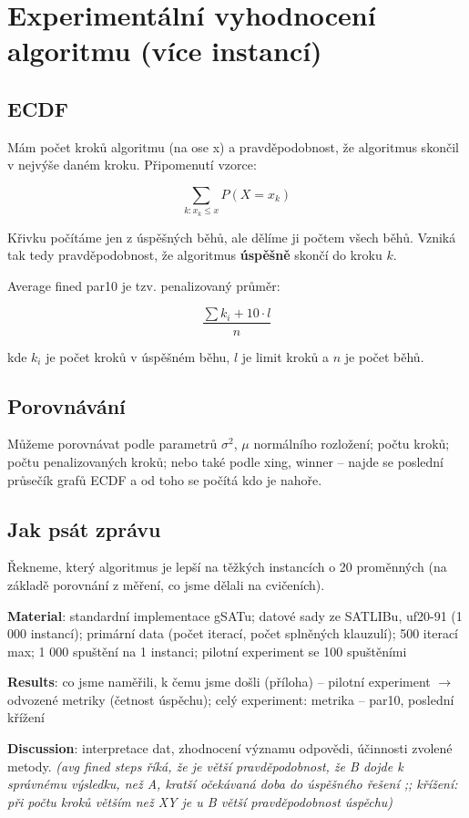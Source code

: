 \section{Experimentální vyhodnocení algoritmu (více instancí)}

\subsection{ECDF}

Mám počet kroků algoritmu (na ose x) a pravděpodobnost, že algoritmus skončil v nejvýše daném kroku. Připomenutí vzorce:

\begin{equation}
    \sum_{k: x_k \leq x}{P(X = x_k)}
\end{equation}

Křivku počítáme jen z úspěšných běhů, ale dělíme ji počtem všech běhů. Vzniká tak tedy pravděpodobnost, že algoritmus \textbf{úspěšně} skončí do kroku $k$.

Average fined par10 je tzv. penalizovaný průměr:

\begin{equation}
    \frac{\sum{k_i} + 10 \cdot l}{n}
\end{equation}

kde $k_i$ je počet kroků v úspěšném běhu, $l$ je limit kroků a $n$ je počet běhů.

\subsection{Porovnávání}

Můžeme porovnávat podle parametrů $\sigma^2$, $\mu$ normálního rozložení; počtu kroků; počtu penalizovaných kroků; nebo také podle xing, winner -- najde se poslední průsečík grafů ECDF a od toho se počítá kdo je nahoře.

\subsection{Jak psát zprávu}

Řekneme, který algoritmus je lepší na těžkých instancích o 20 proměnných (na základě porovnání z měření, co jsme dělali na cvičeních).

\textbf{Material}: standardní implementace gSATu; datové sady ze SATLIBu, uf20-91 (1 000 instancí); primární data (počet iterací, počet splněných klauzulí); 500 iterací max; 1 000 spuštění na 1 instanci; pilotní experiment se 100 spuštěními

\textbf{Results}: co jsme naměřili, k čemu jsme došli (příloha) -- pilotní experiment $\to$ odvozené metriky (četnost úspěchu); celý experiment: metrika -- par10, poslední křížení

\textbf{Discussion}: interpretace dat, zhodnocení významu odpovědi, účinnosti zvolené metody. \textit{(avg fined steps říká, že je větší pravděpodobnost, že B dojde k správnému výsledku, než A, kratší očekávaná doba do úspěšného řešení ;; křížení: při počtu kroků větším než XY je u B větší pravděpodobnost úspěchu)}
